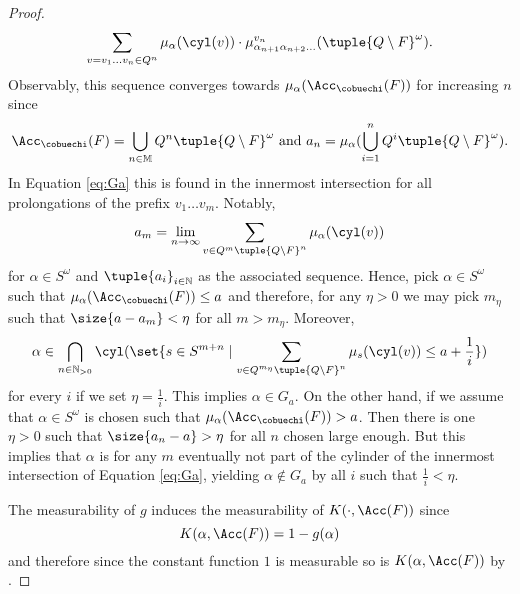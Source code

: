 \begin{proof}
\begin{equation*}
      \sum_{v = v_{1}\dots v_{n}\in Q^{n}}\mu_{\alpha}(\cyl(v))\cdot
        \mu^{v_{n}}_{\alpha_{n+1}\alpha_{n+2}\dots}(
          \tuple{Q\setminus F}^{\omega}).
    \end{equation*}
    Observably, this sequence converges towards 
    $\mu_{\alpha}(\Acc_{\cobuechi}(F))$ for increasing $n$ since
    \begin{equation*}
      \Acc_{\cobuechi}(F) = \bigcup\limits_{n\in\mathbb{M}}Q^{n}
        \tuple{Q\setminus F}^{\omega}
      \text{ and }a_{n} = \mu_{\alpha}(\bigcup\limits_{i = 1}^{n}
        Q^{i}\tuple{Q\setminus F}^{\omega}).
    \end{equation*}
    In Equation \ref{eq:Ga} this is found in the innermost intersection for all
    prolongations of the prefix $v_{1}\dots v_{m}$. Notably,
    \begin{equation*}
      a_{m} = \lim_{n\rightarrow\infty}\sum
        \limits_{v\in Q^{m}\tuple{Q\setminus F}^{n}}\mu_{\alpha}(\cyl(v))
    \end{equation*}
    for $\alpha\in S^{\omega}$ and $\tuple{a_{i}}_{i\in\mathbb{N}}$ as the 
    associated sequence. Hence, pick $\alpha\in S^{\omega}$ such that 
    $\mu_{\alpha}(\Acc_{\cobuechi}(F))\leq a$ and therefore, for any $\eta > 0$ 
    we may pick $m_{\eta}$ such that $\size{a - a_{m}} < \eta$ for all 
    $m > m_{\eta}$. Moreover,
    \begin{equation*}
      \alpha\in\bigcap_{n\in\mathbb{N}_{>0}}\cyl(\set{s\in S^{m+n}\mid
        \sum\limits_{v\in Q^{m_{\eta}}\tuple{Q\setminus F}^{n}}\mu_{s}(
        \cyl(v))\leq a+\frac{1}{i}})
    \end{equation*}
    for every $i$ if we set $\eta = \frac{1}{i}$. This implies 
    $\alpha\in G_{a}$.
    On the other hand, if we assume that $\alpha\in S^{\omega}$ is chosen such
    that $\mu_{\alpha}(\Acc_{\cobuechi}(F)) > a$. Then there is one $\eta > 0$
    such that $\size{a_{n} - a} > \eta$ for all $n$ chosen large enough. But 
    this implies that $\alpha$ is for any $m$ eventually not part of the 
    cylinder of the innermost intersection of Equation \ref{eq:Ga}, yielding 
    $\alpha\not\in G_{a}$ by all $i$ such that $\frac{1}{i} < \eta$.

    The measurability of $g$ induces the measurability of $K(\cdot, \Acc(F))$
    since 
    \begin{equation*}
      K(\alpha, \Acc(F)) = 1 - g(\alpha)
    \end{equation*} 
    and therefore since the constant function $1$ is measurable so is 
    $K(\alpha, \Acc(F))$ by \cite[Theorem 9.4]{Bauer}.
  \end{proof}
